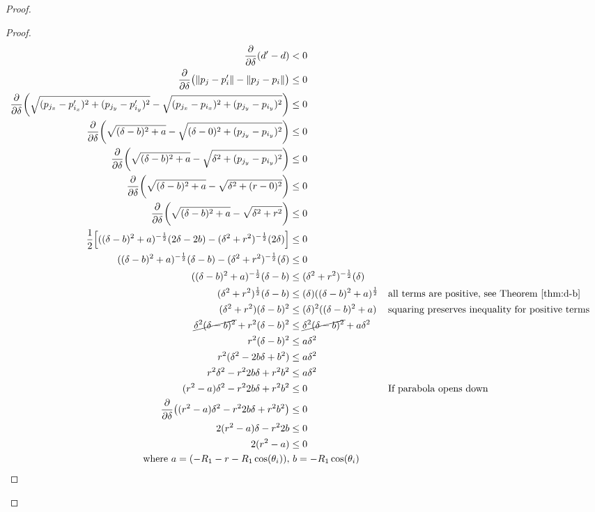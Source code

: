 \documentclass[conference]{IEEEtran}
\begin{document}
\begin{proof}
\begin{proof}
    \begin{align*}
      \frac{\partial}{\partial\delta}(d'-d) &< 0 \\
      \frac{\partial}{\partial\delta}\big(\lVert p_j - p'_i \rVert - \lVert p_j - p_i \rVert\big) &\leq 0 \\
      \frac{\partial}{\partial\delta}\bigg(\sqrt{(p_{j_x} - p'_{i_x})^2 + (p_{j_y} - p'_{i_y})^2} - \sqrt{(p_{j_x} - p_{i_x})^2 + (p_{j_y} - p_{i_y})^2}\bigg) &\leq 0 \\
      \frac{\partial}{\partial\delta}\bigg(\sqrt{(\delta - b)^2 + a} - \sqrt{(\delta - 0)^2 + (p_{j_y} - p_{i_y})^2}\bigg) &\leq 0 \\
      \frac{\partial}{\partial\delta}\bigg(\sqrt{(\delta - b)^2 + a} - \sqrt{\delta^2 + (p_{j_y} - p_{i_y})^2}\bigg) &\leq 0 \\
      \frac{\partial}{\partial\delta}\bigg(\sqrt{(\delta-b)^2 + a} - \sqrt{\delta^2 + (r-0)^2}\bigg) &\leq 0 \\
      \frac{\partial}{\partial\delta}\bigg(\sqrt{(\delta-b)^2 + a} - \sqrt{\delta^2 + r^2}\bigg) &\leq 0 \\
      \frac{1}{2}\Big[((\delta-b)^2 + a)^{-\frac{1}{2}}(2\delta-2b) - (\delta^2 + r^2)^{-\frac{1}{2}}(2\delta)\Big] &\leq 0 \\
      ((\delta-b)^2 + a)^{-\frac{1}{2}}(\delta-b) - (\delta^2 + r^2)^{-\frac{1}{2}}(\delta) &\leq 0 \\
      ((\delta-b)^2 + a)^{-\frac{1}{2}}(\delta-b) &\leq (\delta^2 + r^2)^{-\frac{1}{2}}(\delta) \\
      (\delta^2 + r^2)^{\frac{1}{2}}(\delta-b) &\leq (\delta)((\delta-b)^2 + a)^{\frac{1}{2}} && \text{all terms are positive, see Theorem \ref{thm:d-b}} \\
      (\delta^2 + r^2)(\delta-b)^2 &\leq (\delta)^2((\delta-b)^2 + a) && \text{squaring preserves inequality for positive terms} \\
      \cancel{\delta^2(\delta-b)^2} + r^2(\delta-b)^2 &\leq \cancel{\delta^2(\delta-b)^2} + a\delta^2 \\
      r^2(\delta-b)^2 &\leq a\delta^2 \\
      r^2(\delta^2-2b\delta+b^2) &\leq a\delta^2 \\
      r^2\delta^2 - r^22b\delta + r^2b^2 &\leq a\delta^2 \\
      (r^2 - a)\delta^2 - r^22b\delta + r^2b^2 &\leq 0 && \text{If parabola opens down} \\
      \frac{\partial}{\partial\delta}\big((r^2 - a)\delta^2 - r^22b\delta + r^2b^2\big) &\leq 0 \\
      2(r^2 - a)\delta - r^22b &\leq 0 \\
      2(r^2 - a) &\leq 0 \\
      \text{where}\  a=(-R_1-r-R_1\cos(\theta_i)),&\  b=-R_1\cos(\theta_i)
    \end{align*}


\end{proof}
\end{proof}
\end{document}
